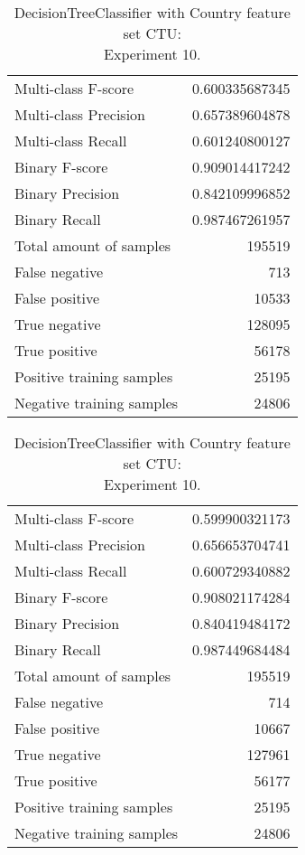 \begin{table}[H]
\begin{minipage}{0.5\textwidth}
\caption{DecisionTreeClassifier with Country feature set CTU: \\Experiment 9.}
\centering
\begin{tabular}{l r}
\toprule
Multi-class F-score & 0.600335687345 \\
Multi-class Precision & 0.657389604878 \\
Multi-class Recall & 0.601240800127 \\
\midrule
Binary F-score & 0.909014417242 \\
Binary Precision & 0.842109996852 \\
Binary Recall & 0.987467261957 \\
\midrule
Total amount of samples & 195519 \\
False negative & 713 \\
False positive & 10533 \\
True negative & 128095 \\
True positive & 56178 \\
\midrule
Positive training samples & 25195 \\
Negative training samples & 24806 \\
\bottomrule
\end{tabular}
\end{minipage}
\hfillx
\begin{minipage}{0.5\textwidth}
\caption{DecisionTreeClassifier with Country feature set CTU: \\Experiment 10.}
\centering
\begin{tabular}{l r}
\toprule
Multi-class F-score & 0.599900321173 \\
Multi-class Precision & 0.656653704741 \\
Multi-class Recall & 0.600729340882 \\
\midrule
Binary F-score & 0.908021174284 \\
Binary Precision & 0.840419484172 \\
Binary Recall & 0.987449684484 \\
\midrule
Total amount of samples & 195519 \\
False negative & 714 \\
False positive & 10667 \\
True negative & 127961 \\
True positive & 56177 \\
\midrule
Positive training samples & 25195 \\
Negative training samples & 24806 \\
\bottomrule
\end{tabular}
\end{minipage}
\end{table}

